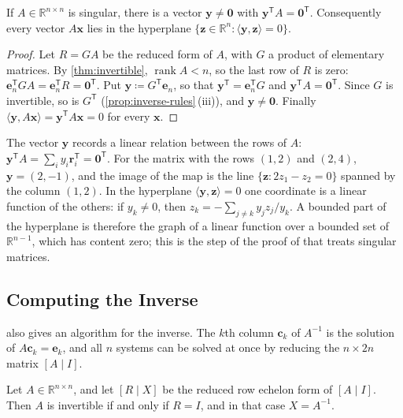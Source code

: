 \begin{proposition}
\label{prop:singular-image}
If $A\in\mathbb R^{n\times n}$ is singular, there is a vector $\mathbf y\ne\mathbf 0$ with $\mathbf y^{\mathsf T}A=\mathbf 0^{\mathsf T}$. Consequently every vector $A\mathbf x$ lies in the hyperplane $\{\mathbf z\in\mathbb R^n: \langle\mathbf y,\mathbf z\rangle=0\}$.
\end{proposition}

\begin{proof}
Let $R=GA$ be the reduced form of $A$, with $G$ a product of elementary matrices. By \cref{thm:invertible}, $\operatorname{rank}A<n$, so the last row of $R$ is zero: $\mathbf e_n^{\mathsf T}GA=\mathbf e_n^{\mathsf T}R=\mathbf 0^{\mathsf T}$. Put $\mathbf y\coloneqq G^{\mathsf T}\mathbf e_n$, so that $\mathbf y^{\mathsf T}=\mathbf e_n^{\mathsf T}G$ and $\mathbf y^{\mathsf T}A=\mathbf 0^{\mathsf T}$. Since $G$ is invertible, so is $G^{\mathsf T}$ (\cref{prop:inverse-rules}\,(iii)), and $\mathbf y\ne\mathbf 0$. Finally $\langle\mathbf y,A\mathbf x\rangle=\mathbf y^{\mathsf T}A\mathbf x=0$ for every $\mathbf x$.
\end{proof}

The vector $\mathbf y$ records a linear relation between the rows of $A$: $\mathbf y^{\mathsf T}A=\sum_iy_i\mathbf r_i^{\mathsf T}=\mathbf 0^{\mathsf T}$. For the matrix with the rows $(1,2)$ and $(2,4)$, $\mathbf y=(2,-1)$, and the image of the map is the line $\{\mathbf z: 2z_1-z_2=0\}$ spanned by the column $(1,2)$. In the hyperplane $\langle\mathbf y,\mathbf z\rangle=0$ one coordinate is a linear function of the others: if $y_k\ne0$, then $z_k=-\sum_{j\ne k}y_jz_j/y_k$. A bounded part of the hyperplane is therefore the graph of a linear function over a bounded set of $\mathbb R^{n-1}$, which has content zero; this is the step of the proof of  that treats singular matrices.

\subsection{Computing the Inverse}

 also gives an algorithm for the inverse. The $k$th column $\mathbf c_k$ of $A^{-1}$ is the solution of $A\mathbf c_k=\mathbf e_k$, and all $n$ systems can be solved at once by reducing the $n\times2n$ matrix $[A\mid I]$.

\begin{proposition}
\label{prop:gauss-jordan}
Let $A\in\mathbb R^{n\times n}$, and let $[R\mid X]$ be the reduced row echelon form of $[A\mid I]$. Then $A$ is invertible if and only if $R=I$, and in that case $X=A^{-1}$.
\end{proposition}

